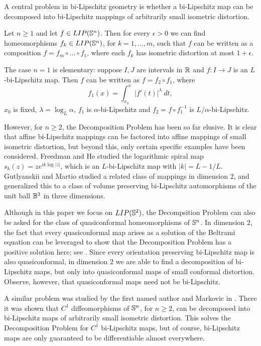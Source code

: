 \documentclass{amsart}
\begin{document}
A central problem in bi-Lipschitz geometry is whether a bi-Lipschitz map can be decomposed into bi-Lipschitz mappings of arbitrarily small isometric distortion.

\begin{conjecture}
Let $n\geq 1$ and let $f\in LIP(\S^n)$. Then for every $\epsilon >0$ we can find homeomorphisms $f_k \in LIP(\S^n)$, for $k=1,\ldots, m$, such that $f$ can be written as a composition $f = f_m \circ \ldots \circ f_1$, where each $f_k$ has isometric distortion at most $1+\epsilon$.
\end{conjecture}

The case $n=1$ is elementary: suppose $I,J$ are intervals in $\R$ and $f:I\to J$ is an $L$-bi-Lipschitz map. Then $f$ can be written as $f = f_2\circ f_1$, where
\[ f_1(x) = \int_{x_0}^x |f'(t) |^{\lambda} \: dt,\]
$x_0$ is fixed, $\lambda = \log_L \alpha$, $f_1$ is $\alpha$-bi-Lipschitz and $f_2 = f\circ f_1^{-1}$ is $L/\alpha$-bi-Lipschitz.



However, for $n\geq 2$, the Decomposition Problem has been so far elusive. It is clear that affine bi-Lipschitz mappings can be factored into affine mappings of small isometric distortion, but beyond this, only certain specific examples have been considered. Freedman and He \cite{FrHe} studied the logarithmic spiral map $s_k(z) = ze^{ik \log |z| }$, which is an $L$-bi-Lipschitz map with $|k| = L-1/L$. Gutlyanskii and Martio \cite{GuMa} studied a related class of mappings in dimension $2$, and generalized this to a class of volume preserving bi-Lipschitz automorphisms of the unit ball $\B^3$ in three dimensions.

Although in this paper we focus on $LIP(\S^2)$, the Decompsition Problem can also be asked for the class of quasiconformal homeomorphisms of $\S^n$. In dimension $2$, the fact that every quasiconformal map arises as a solution of the Beltrami equation can be leveraged to show that the Decomposition Problem has a positive solution here; see \cite[Theorem 4.7]{Lehto}. Since every orientation preserving bi-Lipschitz map is also quasiconformal, in dimension $2$ we are able to find a decomposition of bi-Lipschitz maps, but only into quasiconformal maps of small conformal distortion. Observe, however, that quasiconformal maps need not be bi-Lipschitz.

A similar problem was studied by the first named author and Markovic in \cite{FM}. There it was shown that $C^1$ diffeomorphisms of $\S^n$, for $n\geq 2$, can be decomposed into bi-Lipschitz maps of arbitrarily small isometric distortion. This solves the Decomposition Problem for $C^1$ bi-Lipschitz maps, but of course, bi-Lipschitz maps are only guaranteed to be differentiable almost everywhere.
\end{document}
